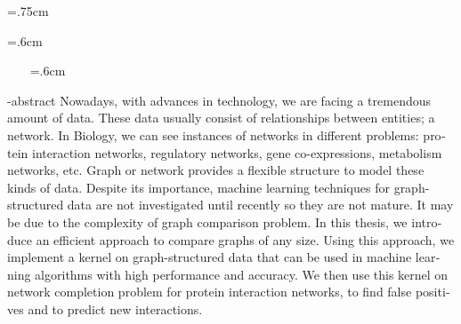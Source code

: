 {\small
{\baselineskip=.75cm

\clearpage{\pagestyle{empty}\cleardoublepage}
}
\clearpage{\pagestyle{empty}\cleardoublepage}
{\baselineskip=.6cm
{}
\printindex}
\clearpage{\pagestyle{empty}\cleardoublepage}


\clearpage{\pagestyle{empty}\cleardoublepage}
}
\newpage
\thispagestyle{empty}
\clearpage
~~~
\baselineskip=.6cm
\begin{latin}
\en-abstract{\noindent
Nowadays, with advances in technology, we are facing a tremendous amount of data. These data usually consist of relationships between entities; a network. In Biology, we can see instances of networks in different problems: protein interaction networks, regulatory networks, gene co-expressions, metabolism networks, etc. Graph or network provides a flexible structure to model these kinds of data. Despite its importance, machine learning techniques for graph-structured data are not investigated until recently so they are not mature. It may be due to the complexity of graph comparison problem. In this thesis, we introduce an efficient approach to compare graphs of any size. Using this approach, we implement a kernel on graph-structured data that can be used in machine learning algorithms with high performance and accuracy. We then use this kernel on network completion problem for protein interaction networks, to find false positives and to predict new interactions.
}
\latinvtitle
\end{latin}
\label{LastPage}
